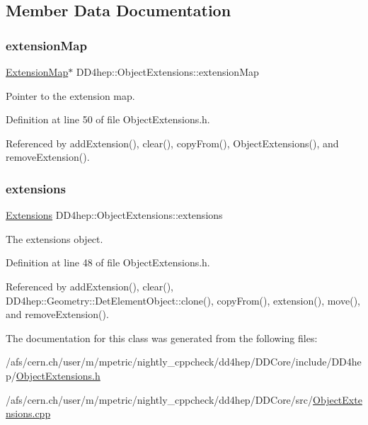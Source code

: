 \subsection{Member Data Documentation}
\hypertarget{class_d_d4hep_1_1_object_extensions_a6f517da18e14dc6f4de73a48744e8262}{}\label{class_d_d4hep_1_1_object_extensions_a6f517da18e14dc6f4de73a48744e8262} 
\subsubsection{\texorpdfstring{extension\+Map}{extensionMap}}
{\footnotesize\ttfamily \hyperlink{class_d_d4hep_1_1_object_extensions_a22c0e42d5fdc9f3fda39c2c3bec14341}{Extension\+Map}$\ast$ D\+D4hep\+::\+Object\+Extensions\+::extension\+Map}



Pointer to the extension map. 



Definition at line 50 of file Object\+Extensions.\+h.



Referenced by add\+Extension(), clear(), copy\+From(), Object\+Extensions(), and remove\+Extension().

\hypertarget{class_d_d4hep_1_1_object_extensions_ac96afa01e09dec7a795c88b67c054007}{}\label{class_d_d4hep_1_1_object_extensions_ac96afa01e09dec7a795c88b67c054007} 
\subsubsection{\texorpdfstring{extensions}{extensions}}
{\footnotesize\ttfamily \hyperlink{class_d_d4hep_1_1_object_extensions_a882c1e22567a450f60d83eb735dd3532}{Extensions} D\+D4hep\+::\+Object\+Extensions\+::extensions}



The extensions object. 



Definition at line 48 of file Object\+Extensions.\+h.



Referenced by add\+Extension(), clear(), D\+D4hep\+::\+Geometry\+::\+Det\+Element\+Object\+::clone(), copy\+From(), extension(), move(), and remove\+Extension().



The documentation for this class was generated from the following files\+:\begin{DoxyCompactItemize}
\item 
/afs/cern.\+ch/user/m/mpetric/nightly\+\_\+cppcheck/dd4hep/\+D\+D\+Core/include/\+D\+D4hep/\hyperlink{_object_extensions_8h}{Object\+Extensions.\+h}\item 
/afs/cern.\+ch/user/m/mpetric/nightly\+\_\+cppcheck/dd4hep/\+D\+D\+Core/src/\hyperlink{_object_extensions_8cpp}{Object\+Extensions.\+cpp}\end{DoxyCompactItemize}
